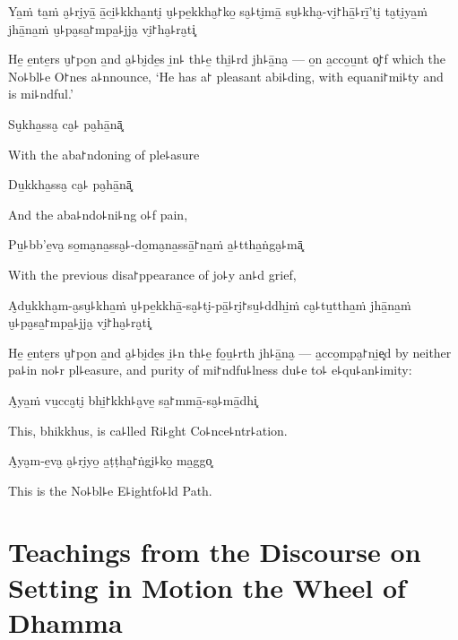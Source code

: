 Ya̱ṁ ta̱ṁ a̮꜕ri̮yā̱ ā̱ci̱꜕kkha̱nti̮ u̮꜕pe̱kkha̮꜓ko̱ sa̮꜕ti̮mā̱ su̮꜕kha̮-vi̮꜓hā̱꜕rī̱'ti̮ ta̮ti̮ya̱ṁ jhā̱na̱ṁ u̮꜕pa̮sa̱꜓mpa̱꜕jja̮ vi̮꜓ha̮꜕ra̮ti͓

\begin{english}
  He̱ e̱nte̱rs u̮꜓po̱n a̱nd a̮꜕bi̮de̱s i̱n꜕ th꜕e̱ thi̱꜕rd jh꜕ā̱na̮ --- o̱n a̱cco̱u̱nt o͓꜓f
  which the No꜕bl꜕e O꜓nes a꜕nnounce, `He has a꜓ pleasant abi꜕ding, with
  equani꜓mi꜕ty and\\ is mi꜕ndful.'
\end{english}

Su̮kha̱ssa̮ ca̮꜕ pa̮hā̱nā͓

\begin{english}
  With the aba꜓ndoning of ple꜕asure
\end{english}

Du̱kkha̱ssa̮ ca̮꜕ pa̮hā̱nā͓

\begin{english}
  And the aba꜕ndo꜕ni꜕ng o꜕f pain,
\end{english}

Pu̱꜕bb'e̱va̮ so̱ma̮na̱ssa̮꜕-do̱ma̮na̱ssā̱꜓na̱ṁ a̱꜕ttha̱ṅga̮꜕mā͓

\begin{english}
  With the previous disa꜓ppearance of jo꜕y an꜕d grief,
\end{english}

A̮du̱kkha̮m-a̮su̮꜕kha̱ṁ u̮꜕pe̱kkhā̱-sa̮꜕ti̮-pā̱꜕ri̮꜓su̱꜕ddhi̱ṁ ca̮꜕tu̱ttha̱ṁ jhā̱na̱ṁ u̮꜕pa̮sa̱꜓mpa̱꜕jja̮ vi̮꜓ha̮꜕ra̮ti͓

\begin{english}
  He̱ e̱nte̱rs u̮꜓po̱n a̱nd a̮꜕bi̮de̱s i̱꜕n th꜕e̱ fo̱u̱꜕rth jh꜕ā̱na̮ --- a̱cco̱mpa̮꜓ni̱e͓d
  by neither pa꜕in no꜕r pl꜕easure, and purity of mi꜓ndfu꜕lness du꜕e to꜕
  e꜕qu꜕an꜕imity:
\end{english}

A̮ya̱ṁ vu̱cca̮ti̮ bhi̱꜓kkh꜕a̮ve̱ sa̱꜓mmā̱-sa̮꜕mā̱dhi͓

\begin{english}
  This, bhikkhus, is ca꜕lled Ri꜕ght Co꜕nce꜕ntr꜕ation.
\end{english}

A̮ya̮m-e̱va̮ a̮꜕ri̮yo̱ a̱ṭṭha̱꜓ṅgi̮꜕ko̱ ma̱ggo͓

\begin{english}
  This is the No꜕bl꜕e E꜕ightfo꜕ld Path.
\end{english}

\chapter[The Wheel of Dhamma]{Teachings from the Discourse on Setting in Motion the Wheel of Dhamma}

